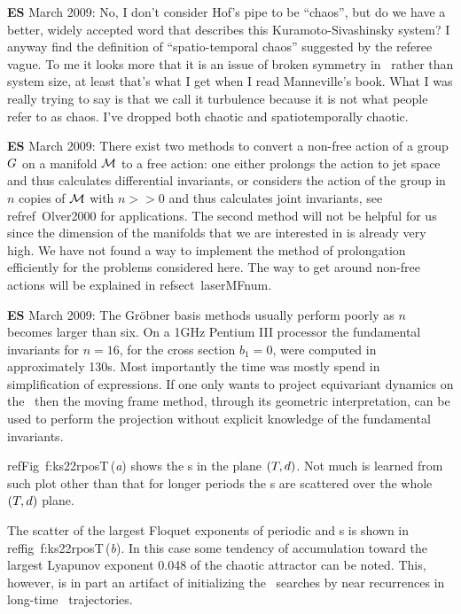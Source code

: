 {\bf ES} March 2009: No, I don't consider Hof's pipe to be ``chaos'',
		but do we have a better, widely accepted word
		that describes this Kuramoto-Sivashinsky system? I anyway
		find the definition of ``spatio-temporal chaos'' suggested
		by the referee vague. To me it looks more that it is an issue
		of broken symmetry in \KS\ rather than system size,
		at least that's what I get when I read Manneville's book.
		What I was really trying to
		say is that we call it turbulence because it is not
		what people refer to as chaos. I've dropped both chaotic
		and spatiotemporally chaotic.


{\bf ES} March 2009:
There exist two methods to convert a non-free action of a group $G$ on a manifold $\mathcal{M}$
to a free action: one either prolongs the action to jet space
and thus calculates differential invariants, or considers the
action of the group in $n$ copies of $\mathcal{M}$ with $n>>0$ and
thus calculates joint invariants, see refref~{Olver2000} for
applications. The second method will not be helpful for us
since the dimension of the manifolds that we are interested
in is already very high. We have not found a way to implement
the method of prolongation efficiently for the problems
considered here. The way to get around non-free actions will
be explained in refsect~{laserMFnum}.


{\bf ES} March 2009:
The Gr\"{o}bner basis methods usually perform poorly as $n$
becomes larger than six. On a 1GHz Pentium III processor the
fundamental invariants for $n=16$, for the cross section
$b_1=0$, were computed in approximately 130s. Most
importantly the time was mostly spend in simplification of
expressions. If one only wants to project equivariant
dynamics on the \reducedsp\ then the moving frame method,
through its geometric interpretation, can be used to perform
the projection without explicit knowledge of the fundamental
invariants.

refFig~{f:ks22rposT}\,(\textit{a}) shows the \rpo s in the plane
$({T_{}},d)$.  Not much is learned from such plot other than
that for longer periods the \rpo s are scattered over the
whole $({T_{}},d)$ plane.

The scatter of the largest Floquet exponents
of periodic and \rpo s is shown in reffig~{f:ks22rposT}\,(\textit{b}).
In this case some tendency of accumulation toward the largest
Lyapunov exponent 0.048 of the chaotic attractor
can be noted.  This, however, is in part an artifact of initializing
the \rpo\ searches by near recurrences in long-time \statesp\
trajectories.


